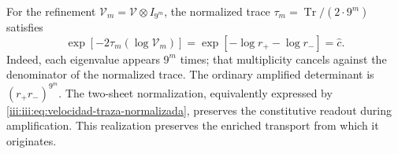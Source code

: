 For the refinement $\mathcal V_m=\mathcal V\otimes I_{9^m}$, the
normalized trace $\tau_m=\operatorname{Tr}/(2\cdot9^m)$ satisfies
\begin{equation}
 \exp[-2\tau_m(\log\mathcal V_m)]
 =\exp[-\log r_+-\log r_-]=\widehat c.
 \label{iii:iii:eq:velocidad-traza-normalizada}
\end{equation}
Indeed, each eigenvalue appears $9^m$ times; that multiplicity
cancels against the denominator of the normalized trace. The ordinary
amplified determinant is $(r_+r_-)^{9^m}$. The two-sheet normalization,
equivalently expressed by \eqref{iii:iii:eq:velocidad-traza-normalizada},
preserves the constitutive readout during amplification. This
realization preserves the enriched transport from which it originates.

